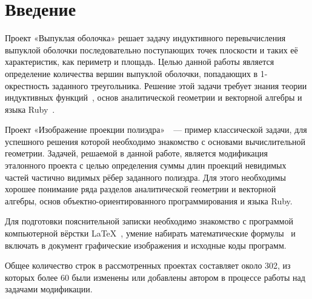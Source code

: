 \section{Введение}

Проект «Выпуклая оболочка»\cite{convex} решает задачу индуктивного 
перевычисления 
выпуклой оболочки последовательно поступающих точек плоскости и таких её
характеристик, как периметр и площадь. Целью данной работы является
определение количества вершин выпуклой оболочки, попадающих в 1-окрестность
заданного треугольника. Решение этой задачи требует знания теории индуктивных
функций~\cite{roganov-2002}, основ аналитической геометрии и векторной алгебры
и языка Ruby~\cite{ruby}.

Проект «Изображение проекции полиэдра»~\cite{polyedr}~--- пример
классической задачи, для успешного решения которой необходимо знакомство с
основами вычислительной геометрии. Задачей, решаемой в данной работе, является
модификация эталонного проекта с целью определения суммы длин проекций 
невидимых частей частично видимых рёбер заданного полиэдра. Для этого 
необходимы хорошее понимание ряда разделов аналитической геометрии и 
векторной алгебры, основ объектно-ориентированного
программирования и языка Ruby. 
  
Для подготовки пояснительной записки необходимо знакомство с программой
компьютерной вёрстки \LaTeX~\cite{rlatex}, умение набирать математические 
формулы~\cite{texbook} и включать в документ графические изображения и исходные
коды программ.

Общее количество строк в рассмотренных проектах составляет около 302, из которых
более 60 были изменены или добавлены автором в процессе работы
над задачами модификации.
